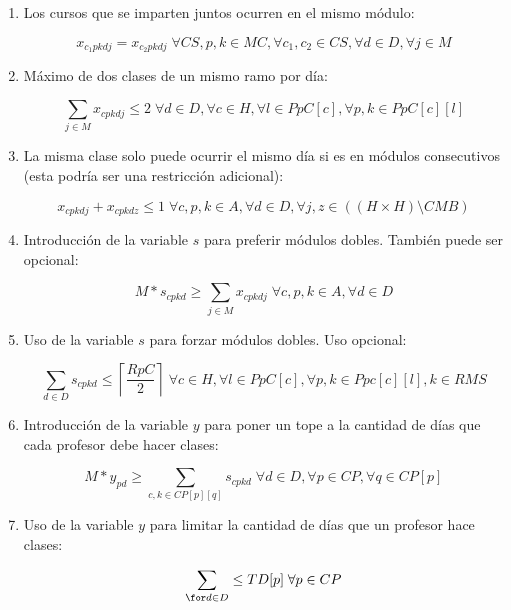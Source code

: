 \documentclass[letterpaper]{article}
\begin{document}
\begin{enumerate}
    \item Los cursos que se imparten juntos ocurren en el mismo módulo:

    $$x_{c_1pkdj} = x_{c_2pkdj} \; \forall CS,p,k \in MC, \forall c_1,c_2 \in CS, \forall d \in D, \forall j \in M$$

    \item Máximo de dos clases de un mismo ramo por día:

    $$\sum_{j \in M} x_{cpkdj} \leq 2 \; \forall d \in D, \forall c \in H, \forall l \in PpC[c], \forall p,k \in PpC[c][l]$$

    \item La misma clase solo puede ocurrir el mismo día si es en módulos consecutivos (esta podría ser una restricción adicional):

    $$x_{cpkdj} + x_{cpkdz} \leq 1 \; \forall c,p,k \in A, \forall d \in D, \forall j,z \in \left((H \times H) \setminus CMB \right)$$

    \item Introducción de la variable $s$ para preferir módulos dobles. También puede ser opcional:

    $$M * s_{cpkd} \geq \sum_{j \in M} x_{cpkdj} \; \forall c,p,k \in A, \forall d \in D$$

    \item Uso de la variable $s$ para forzar módulos dobles. Uso opcional:

    $$\sum_{d \in D} s_{cpkd} \leq \left\lceil \frac{RpC}{2} \right\rceil \; \forall c \in H, \forall l \in PpC[c], \forall p,k \in Ppc[c][l], k \in RMS$$

    \item Introducción de la variable $y$ para poner un tope a la cantidad de días que cada profesor debe hacer clases:

    $$M * y_{pd} \geq \sum_{c,k \in CP[p][q]} s_{cpkd} \; \forall d \in D, \forall p \in CP, \forall q \in CP[p]$$

    \item Uso de la variable $y$ para limitar la cantidad de días que un profesor hace clases:

    $$\sum_{\for d \in D} \leq TD[p] \; \forall p \in CP$$
\end{enumerate}
\end{document}
